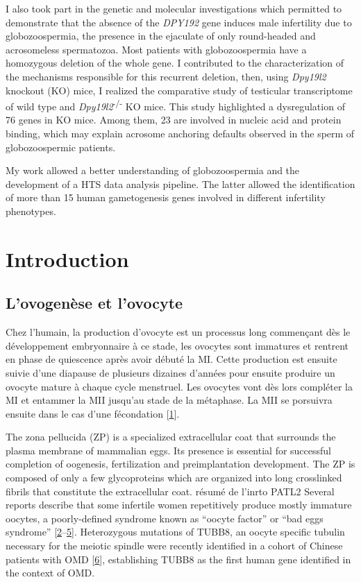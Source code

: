 \documentclass[12pt,a4paper,twoside]{ugathesis}
\theoremstyle{definition}
\theoremstyle{definition}
\theoremstyle{definition}
\theoremstyle{remark}
\begin{document}
I also took part in the genetic and molecular investigations which
permitted to demonstrate that the absence of the \emph{DPY192} gene
induces male infertility due to globozoospermia, the presence in the
ejaculate of only round-headed and acrosomeless spermatozoa. Most
patients with globozoospermia have a homozygous deletion of the whole
gene. I contributed to the characterization of the mechanisms
responsible for this recurrent deletion, then, using \emph{Dpy19l2}
knockout (KO) mice, I realized the comparative study of testicular
transcriptome of wild type and \emph{Dpy19l2}\textsuperscript{-/-} KO
mice. This study highlighted a dysregulation of 76 genes in KO mice.
Among them, 23 are involved in nucleic acid and protein binding, which
may explain acrosome anchoring defaults observed in the sperm of
globozoospermic patients.

My work allowed a better understanding of globozoospermia and the
development of a HTS data analysis pipeline. The latter allowed the
identification of more than 15 human gametogenesis genes involved in
different infertility phenotypes.

\chapter{Introduction}\label{introInf}

\newpage  

\section{L'ovogenèse et l'ovocyte}\label{lovogenese-et-lovocyte}

Chez l'humain, la production d'ovocyte est un processus long commençant
dès le développement embryonnaire à ce stade, les ovocytes sont
immatures et rentrent en phase de quiescence après avoir débuté la MI.
Cette production est ensuite suivie d'une diapause de plusieurs dizaines
d'années pour ensuite produire un ovocyte mature à chaque cycle
menstruel. Les ovocytes vont dès lors compléter la MI et entammer la MII
jusqu'au stade de la métaphase. La MII se porsuivra ensuite dans le cas
d'une fécondation {[}\protect\hyperlink{ref-Tosti2016}{1}{]}.

The zona pellucida (ZP) is a specialized extracellular coat that
surrounds the plasma membrane of mammalian eggs. Its presence is
essential for successful completion of oogenesis, fertilization and
preimplantation development. The ZP is composed of only a few
glycoproteins which are organized into long crosslinked fibrils that
constitute the extracellular coat. résumé de l'inrto PATL2 Several
reports describe that some infertile women repetitively produce mostly
immature oocytes, a poorly-defined syndrome known as ``oocyte factor''
or ``bad eggs syndrome''
{[}\protect\hyperlink{ref-Hartshorne1999}{2}--\protect\hyperlink{ref-Hourvitz2010}{5}{]}.
Heterozygous mutations of TUBB8, an oocyte specific tubulin necessary
for the meiotic spindle were recently identified in a cohort of Chinese
patients with OMD {[}\protect\hyperlink{ref-Feng2016}{6}{]},
establishing TUBB8 as the first human gene identified in the context of
OMD.
\end{document}

